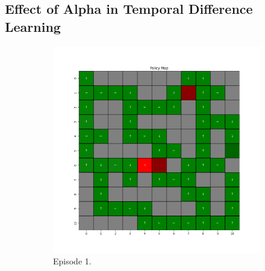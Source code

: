 \documentclass{assignment}
\begin{document}
\subsection{Effect of Alpha in Temporal Difference Learning}

\begin{figure}[H]
    \begin{subfigure}{0.3\textwidth}
        \includegraphics[width=\textwidth]{figures/policy_td/alpha_sweep/policy_alpha_0.001_gamma_0.95_epsilon_0.2_iteration_1.png}
    \caption{Episode 1.}
    \end{subfigure}\hfill
    \begin{subfigure}{0.3\textwidth}

\end{subfigure}
\end{figure}
\end{document}
